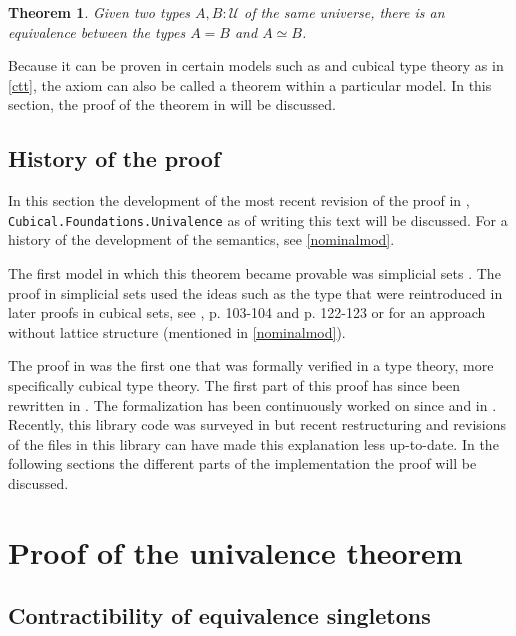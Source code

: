 \documentclass[12pt,a4paper,twoside,xetex]{book} %
\newtheorem{theorem}{Theorem}[section]
\begin{document}
\begin{theorem}
 Given two types $A, B : \mathcal{U}$ of the same universe, there is an 
equivalence between the types $A = B$ and $A \simeq B$.
 \end{theorem}

Because it can be proven in certain models such as \cite{Kapulkin2012} and 
cubical type theory as in \cref{ctt}, the axiom can also be called a theorem 
within a particular model. In this section, the proof of the theorem in 
\cite{Moertberg2018} will be discussed.

\subsection{History of the proof}

In this section the development of the most recent revision of the proof in  \cite{Moertberg2018}, \texttt{Cubical.Foundations.Univalence} as of writing this 
text will be discussed. For a history of the development of the semantics, see \cref{nominalmod}.

The first model in which this theorem became provable was simplicial sets 
\cite{Kapulkin2012}. The proof in simplicial sets used the ideas such as the 
 type that were reintroduced in later proofs in cubical sets, see 
\cite{Huber2016}, p. 103-104 and p. 122-123 or \cite{Bezem2018} for an approach 
without lattice structure (mentioned in \cref{nominalmod}). 

The proof in \cite{Huber2016} was the first one that was formally verified in a 
type theory, more specifically cubical type theory. The first part of this proof has since been rewritten 
in \cite{Weinberger2016}. The formalization has been continuously worked on 
since \cite{Moertberg2015} and \cite{Cohen2016} in \cite{Moertberg2018}. Recently, this library code was surveyed in \cite{Moertberg2018a} but recent restructuring and revisions of the files in this library can have made this explanation less up-to-date. In the following sections the different parts of the implementation the proof will be discussed.

\section{Proof of the univalence theorem}

\subsection{Contractibility of equivalence singletons}
\end{document}

